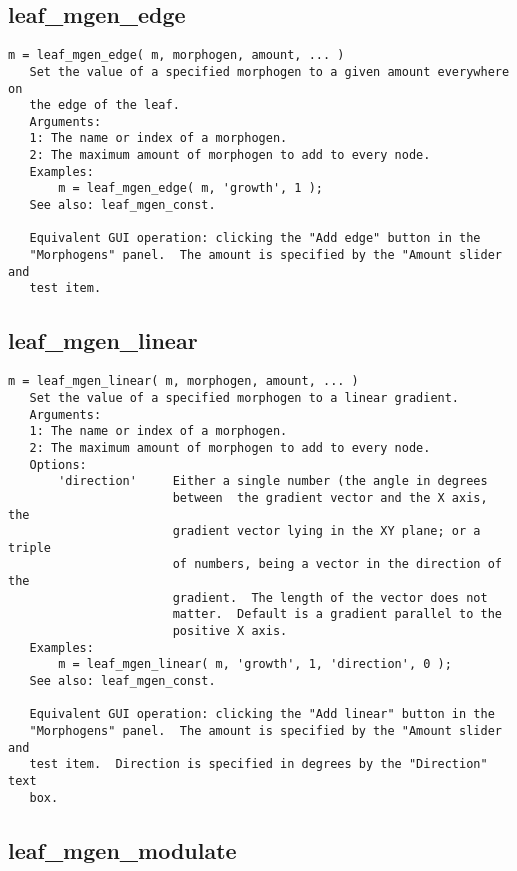 \subsection{leaf\_mgen\_edge}\label{section-leaf-mgen-edge}

\begin{verbatim}
m = leaf_mgen_edge( m, morphogen, amount, ... )
   Set the value of a specified morphogen to a given amount everywhere on
   the edge of the leaf.
   Arguments:
   1: The name or index of a morphogen.
   2: The maximum amount of morphogen to add to every node.
   Examples:
       m = leaf_mgen_edge( m, 'growth', 1 );
   See also: leaf_mgen_const.

   Equivalent GUI operation: clicking the "Add edge" button in the
   "Morphogens" panel.  The amount is specified by the "Amount slider and
   test item.
\end{verbatim}

\subsection{leaf\_mgen\_linear}\label{section-leaf-mgen-linear}

\begin{verbatim}
m = leaf_mgen_linear( m, morphogen, amount, ... )
   Set the value of a specified morphogen to a linear gradient.
   Arguments:
   1: The name or index of a morphogen.
   2: The maximum amount of morphogen to add to every node.
   Options:
       'direction'     Either a single number (the angle in degrees
                       between  the gradient vector and the X axis, the
                       gradient vector lying in the XY plane; or a triple
                       of numbers, being a vector in the direction of the
                       gradient.  The length of the vector does not
                       matter.  Default is a gradient parallel to the
                       positive X axis. 
   Examples:
       m = leaf_mgen_linear( m, 'growth', 1, 'direction', 0 );
   See also: leaf_mgen_const.

   Equivalent GUI operation: clicking the "Add linear" button in the
   "Morphogens" panel.  The amount is specified by the "Amount slider and
   test item.  Direction is specified in degrees by the "Direction" text
   box.
\end{verbatim}

\subsection{leaf\_mgen\_modulate}\label{section-leaf-mgen-modulate}

